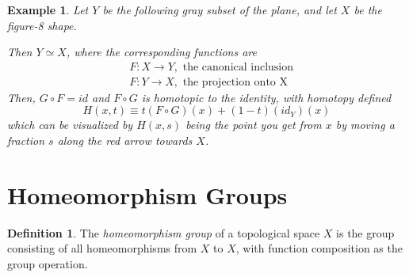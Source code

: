 \documentclass{article}
\newtheorem{example}{Example}[section]
\theoremstyle{remark}
\theoremstyle{definition}
\newtheorem{definition}{Definition}[section]
\begin{document}
\begin{example}
  Let $Y$ be the following gray subset of the plane, and let $X$ be the figure-8 shape. 
  \begin{center}
\end{center}
Then $Y \simeq X$, where the corresponding functions are
\begin{align*}
    & F: X \longrightarrow Y, \text{ the canonical inclusion} \\
    & F: Y \longrightarrow X, \text{ the projection onto X}
\end{align*}
Then, $G \circ F = id$ and $F \circ G$ is homotopic to the identity, with homotopy defined
\[H(x, t) \equiv t (F \circ G) (x) + (1-t) (id_Y) (x)\]
which can be visualized by $H(x, s)$ being the point you get from $x$ by moving a fraction $s$ along the red arrow towards $X$. 
\end{example}

\section{Homeomorphism Groups}

\begin{definition}
The \textit{homeomorphism group} of a topological space $X$ is the group consisting of all homeomorphisms from $X$ to $X$, with function composition as the group operation.
\end{definition}
\end{document}
